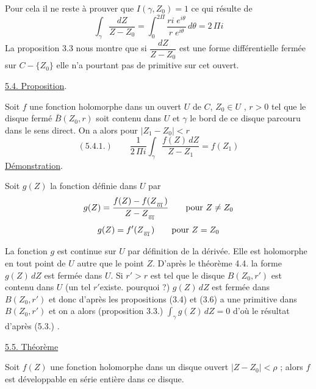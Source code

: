 
Pour cela il ne reste à prouver que $I(\gamma, Z_0) = 1$ ce qui résulte de
\[ \int_{\gamma} \frac{dZ}{Z - Z_0} = \int_0^{2\Pi} \frac{ri\; e^{i\theta}}{r\; e^{i\theta}}\, d\theta = 2\,\Pi i \]
La proposition 3.3 nous montre que si $\dfrac{dZ}{Z - Z_0}$ est une forme différentielle
fermée sur $C - \{Z_0\}$ elle n'a pourtant pas de primitive sur cet ouvert.

\uline{5.4. Proposition}.

Soit $f$ une fonction holomorphe dans un ouvert $U$ de $C$, $Z_0 \in U$ ,
$r > 0$ tel que le disque fermé $\bar{B}(Z_0, r)$ soit contenu dans $U$\unsure{,} et $\gamma$ le bord
de ce disque parcouru dans le sens direct. On a alors pour $|Z_1 - Z_0| < r$
\[ (5.4.1.) \qquad \frac{1}{2\,\Pi i} \int_{\gamma} \frac{f(Z)\, dZ}{Z - Z_1} = f(Z_1) \]
\uline{Démonstration}.

Soit $g(Z)$ la fonction définie dans $U$ par
\[ g(Z) = \frac{f(Z) - f(Z_{\over{0}{1}})}{Z - Z_{\over{0}{1}}} \qquad \text{pour } Z \neq Z_0 \]
\[ g(Z) = f'(Z_{\over{0}{1}}) \qquad \text{pour } Z = Z_0 \]

La fonction $g$ est continue sur $U$ par définition de la dérivée.
Elle est holomorphe en tout point de $U$ autre que le point $Z$. D'après le
théorème 4.4. la forme $g(Z)\, dZ$ est fermée dans $U$. Si $r' > r$ est tel que
le disque $B(Z_0, r')$ est contenu dans $U$ (un tel $r'$existe. pourquoi ?)
$g(Z)\, dZ$ est fermée dans $B(Z_0, r')$ et donc d'après les propositions (3.4)
et (3.6) a une primitive dans $B(Z_0, r')$ et on a alors (proposition 3.3.)
$\int_{\gamma} g(Z)\, dZ = 0$ d'où le résultat d'après (5.3.) .

\uline{5.5. Théorème}

Soit $f(Z)$ une fonction holomorphe dans un disque ouvert $|Z - Z_0| < \rho$ ;
alors $f$ est développable en série entière dans ce disque.

